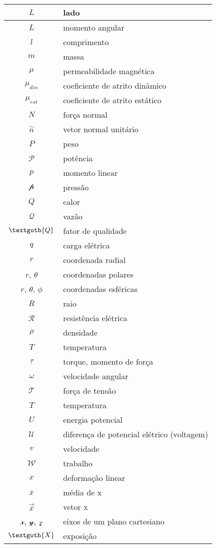 \begin{longtable}{|c|l|}
  $L$ & lado \\ \hline
  $L$ & momento angular \\ \hline
  $l$ & comprimento \\ \hline
  $m$ & massa \\ \hline
  $\mu$ & permeabilidade magnética \\ \hline
  $\mu_{din}$ & coeficiente de atrito dinâmico \\ \hline
  $\mu_{est}$ & coeficiente de atrito estático \\ \hline
  $N$ & força normal \\ \hline
  $\hat{n}$ & vetor normal unitário \\ \hline
  $P$ & peso \\ \hline
  $\mathscr{P}$ & potência \\ \hline
  $p$ & momento linear \\ \hline
  $\mathscr{p}$ & pressão \\ \hline
  $Q$ & calor \\ \hline
  $\mathscr{Q}$ & vazão \\ \hline
  $\textgoth{Q}$ & fator de qualidade \\ \hline  
  $q$ & carga elétrica \\ \hline
  $r$ & coordenada radial \\ \hline
  $r$, $\theta$ & coordenadas polares \\ \hline
  $r$, $\theta$, $\phi$ & coordenadas esféricas \\ \hline  
  $R$ & raio \\ \hline
  $\mathscr{R}$ & resistência elétrica \\ \hline
  $\rho$ & densidade \\ \hline
  $T$ & temperatura \\ \hline
  $\tau$ & torque, momento de força \\ \hline
  $\omega$ & velocidade angular \\ \hline
  $\mathscr{T}$ & força de tensão \\ \hline
  $T$ & temperatura \\ \hline
  $U$ & energia potencial \\ \hline
  $\mathscr{U}$ & diferença de potencial elétrico (voltagem) \\ \hline
  $v$ & velocidade \\ \hline
  $\mathscr{W}$ & trabalho \\ \hline 
  $x$ & deformação linear \\ \hline
  $\bar{x}$ & média de x \\ \hline
  $\vec{x}$ & vetor x \\ \hline
  $\mathscr{x}$, $\mathscr{y}$, $\mathscr{z}$ & eixos de um plano cartesiano \\ \hline
  $\textgoth{X}$ & exposição \\ \hline
\end{longtable}